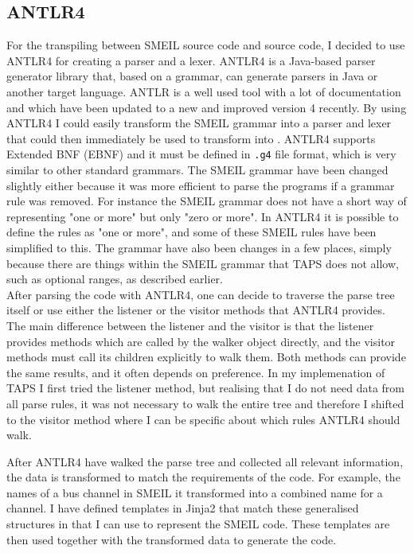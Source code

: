 \subsection{ANTLR4}
For the transpiling between SMEIL source code and \cspm{} source code, I decided to use ANTLR4 for creating a parser and a lexer. ANTLR4 is a Java-based parser generator library that, based on a grammar, can generate parsers in Java or another target language. ANTLR is a well used tool with a lot of documentation and which have been updated to a new and improved version 4 recently. By using ANTLR4 I could easily transform the SMEIL grammar into a parser and lexer that could then immediately be used to transform into \cspm{}.
ANTLR4 supports Extended BNF (EBNF) and it must be defined in \texttt{.g4} file format, which is very similar to other standard grammars. The SMEIL grammar have been changed slightly either because it was more efficient to parse the programs if a grammar rule was removed. For instance the SMEIL grammar does not have a short way of representing "one or more" but only "zero or more". In ANTLR4 it is possible to define the rules as "one or more", and some of these SMEIL rules have been simplified to this. The grammar have also been changes in a few places, simply because there are things within the SMEIL grammar that TAPS does not allow, such as optional ranges, as described earlier.\\

After parsing the code with ANTLR4, one can decide to traverse the parse tree itself or use either the listener or the visitor methods that ANTLR4 provides. The main difference between the listener and the visitor is that the listener provides methods which are called by the walker object directly, and the visitor methods must call its children explicitly to walk them. Both methods can provide the same results, and it often depends on preference. In my implemenation of TAPS I first tried the listener method, but realising that I do not need data from all parse rules, it was not necessary to walk the entire tree and therefore I shifted to the visitor method where I can be specific about which rules ANTLR4 should walk.

After ANTLR4 have walked the parse tree and collected all relevant information, the data is transformed to match the requirements of the \cspm{} code. For example, the names of a bus channel in SMEIL it transformed into a combined name for a \cspm{} channel. I have defined templates in Jinja2 that match these generalised structures in \cspm{} that I can use to represent the SMEIL code. These templates are then used together with the transformed data to generate the \cspm{} code.

